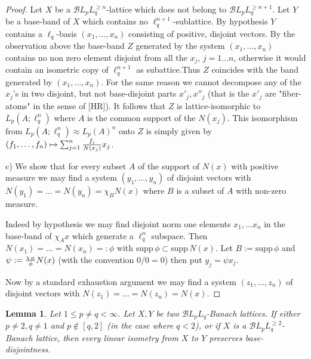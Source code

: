 \documentclass[11pt]{amsart}
\theoremstyle{plain}
\newtheorem{lemma}[theorem]{Lemma}
\theoremstyle{remark}
\begin{document}
\begin{proof}
Let $X$ be a $\mathcal BL_pL_q^{\ge n}$-lattice which  does not belong  to $\mathcal BL_pL_q^{\ge n+1}$. Let $Y$ be a base-band of $X$ which contains no $\ell_q^{n+1}$-sublattice. By hypothesis $Y$ contains a $\ell_q$-basis  $(x_1,\dots, x_n)$ consisting of positive, disjoint vectors. By the observation  above the base-band $Z$ generated by the system   $(x_1,\dots, x_n)$ contains no non zero element disjoint from all the $x_j$, $j=1\dots n$, otherwise it would contain an isometric copy of $\ell_q^{n+1}$ as subattice.Thus $Z$ coincides with the band generated by $(x_1,\dots, x_n)$. For the same reason  we cannot decompose any of the $x_j$'s in two disjoint, but not base-disjoint parts $x'_j,x''_j$ (that is the $x'_j$ are "fiber-atoms" in the sense of [HR]). It follows that $Z$ is lattice-isomorphic to  $L_p(A;\ell_q^n)$ where $A$ is the common support of the $N(x_j)$. This isomorphism from  $L_p(A;\ell_q^n)\approx L_p(A)^n$ onto $Z$ is simply given by $(f_1,\dots,f_n)\mapsto \sum_{j=1}^n {f_j \over N(x_j)}x_j$.

c) We show that for every subset $A$ of the support of $N(x)$ with positive measure we may find a system $(y_1,\dots,y_n)$ of disjoint vectors with $N(y_1)=\dots =N(y_n)=\chi_B N(x)$ where $B$ is a subset of  $A$ with non-zero measure. 

Indeed by hypothesis we may find disjoint norm one elements $x_1,\dots x_n$ in the base-band of $\chi_Ax$ which generate a $\ell_q^n$ subspace. Then $N(x_1)=\dots =N(x_n)=:\phi$ with $\mathrm{supp}\,\phi\subset \mathrm{supp}\,N(x)$. Let $B:= \mathrm{supp}\,\phi$ and $\psi:= {\chi_B \over \phi}N(x)$ (with the convention $0/0=0$) then put $y_j=\psi x_j$.

Now by a standard exhaustion argument we may find a system $(z_1,\dots,z_n)$ of disjoint vectors with $N(z_1)=\dots =N(z_n)=N(x)$.
\end{proof}

\begin{lemma}\label{base-disjointness-preservation} Let $1\le p\ne q<\infty$. Let $X,Y$ be two $\mathcal BL_pL_q$-Banach lattices. If either $p\ne 2, q\ne 1$ and  $p\not\in [q,2]$ (in the case  where $q<2$), or if $X$ is a $\mathcal BL_pL_q^{\ge 2}$-Banach lattice, then every linear isometry from $X$   to $Y$ preserves base-disjointness. \end{lemma}
\end{document}
